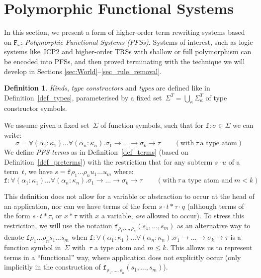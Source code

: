 \documentclass[a4paper,UKenglish,cleveref,autoref,numberwithinsect]{lipics-v2019}
\theoremstyle{definition}
\newtheorem{defn}[theorem]{Definition}
\newcommand{\Fomega}{\mathtt{F}_\omega}
\newcommand{\arrtype}{\rightarrow}
\newcommand{\app}[2]{#1 \cdot #2}
\begin{document}
\section{Polymorphic Functional Systems}\label{sec_systems}

In this section, we present a form of higher-order term rewriting
systems based on $\Fomega$: \emph{Polymorphic Functional Systems
  (PFSs)}. Systems of interest, such as logic systems like~ICP2 and
higher-order TRSs with shallow or full polymorphism can be encoded
into PFSs, and then proved terminating with the technique we will
develop in Sections \ref{sec:World}--\ref{sec_rule_removal}.

\begin{defn}\label{def_pafs_types_terms}
  \emph{Kinds}, \emph{type constructors} and \emph{types} are defined
  like in Definition~\ref{def_types}, parameterised by a fixed
  set~$\Sigma^T = \bigcup_{\kappa}\Sigma^T_\kappa$ of type constructor
  symbols.

  We assume given a fixed set~$\Sigma$ of function symbols, such
  that for $\mathtt{f} : \sigma \in \Sigma$ we can write:
    \[
    \sigma = \forall (\alpha_1 : \kappa_1) \ldots \forall (\alpha_n : \kappa_n)
    . \sigma_1 \arrtype \ldots \arrtype \sigma_k \arrtype \tau
    \quad\quad (\text{with}\ \tau\ \text{a type atom})
    \]
  We define \emph{PFS
    terms} as in Definition~\ref{def_terms} (based on
  Definition~\ref{def_preterms}) with the restriction that
  for any subterm $\app{s}{u}$ of a term~$t$, we have $s =
    \mathtt{f} \rho_1 \ldots \rho_n u_1 \ldots u_m$ where:
    \[
    \mathtt{f} : \forall (\alpha_1 : \kappa_1) \ldots
    \forall (\alpha_n : \kappa_n) . \sigma_1 \arrtype \ldots \arrtype
    \sigma_k \arrtype \tau
    \quad\quad (\text{with}\ \tau\ \text{a type atom and}\ m < k)
    \]
\end{defn}

This definition does not allow for a variable or
abstraction to occur at the head of an application, nor can we have
terms of the form $s \cdot t * \tau \cdot q$ (although terms of the
form $s \cdot t * \tau$, or $x * \tau$ with $x$ a variable,
\emph{are} allowed to occur).  To stress this restriction, we will
use the notation
$\mathtt{f}_{\rho_1,\ldots,\rho_n}(s_1,\ldots,s_m)$ as an alternative
way to denote
$\mathtt{f} \rho_1 \ldots \rho_n s_1 \ldots s_m$ when
$
  \mathtt{f} : \forall (\alpha_1 : \kappa_1) \ldots
  \forall (\alpha_n : \kappa_n) . \sigma_1 \arrtype \ldots \arrtype
  \sigma_k \arrtype \tau
$
is a function symbol in~$\Sigma$ with~$\tau$ a type atom and $m \leq k$.
This allows us to represent terms in a ``functional'' way, where
application does not explicitly occur (only implicitly in the
construction of $\mathtt{f}_{\rho_1,\ldots,\rho_n}(s_1,\ldots,s_m)$).
\end{document}
